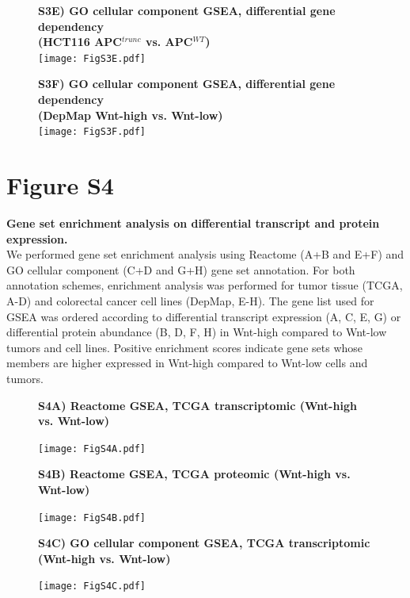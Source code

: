 \documentclass[11pt,a4paper,titlepage]{article}
\begin{document}
\begin{figure}[h!]
\textbf{S3E) GO cellular component GSEA, differential gene dependency\\(HCT116 APC$^{trunc}$ vs. APC$^{WT}$)}\\

\smallskip
\texttt{[image: FigS3E.pdf]} 
\end{figure}

\begin{figure}[h!]
\textbf{S3F) GO cellular component GSEA, differential gene dependency\\(DepMap Wnt-high vs. Wnt-low)}\\

\smallskip
\texttt{[image: FigS3F.pdf]} 
\end{figure}


\clearpage

\section*{Figure S4}



\textbf{Gene set enrichment analysis on differential transcript and protein expression.}\\
We performed gene set enrichment analysis using Reactome (A+B and E+F) and GO cellular component (C+D and G+H) gene set annotation. For both annotation schemes, enrichment analysis was performed for tumor tissue (TCGA, A-D) and colorectal cancer cell lines (DepMap, E-H). The gene list used for GSEA was ordered according to differential transcript expression (A, C, E, G) or differential protein abundance (B, D, F, H) in Wnt-high compared to Wnt-low tumors and cell lines. Positive enrichment scores indicate gene sets whose members are higher expressed in Wnt-high compared to Wnt-low cells and tumors.

\begin{figure}[h!]
\textbf{S4A) Reactome GSEA, TCGA transcriptomic (Wnt-high vs. Wnt-low)}

\smallskip
\texttt{[image: FigS4A.pdf]} 
\end{figure}

\begin{figure}[h!]
\textbf{S4B) Reactome GSEA, TCGA proteomic (Wnt-high vs. Wnt-low)}

\smallskip
\texttt{[image: FigS4B.pdf]} 
\end{figure}

\begin{figure}[h!]
\textbf{S4C) GO cellular component GSEA, TCGA transcriptomic (Wnt-high vs. Wnt-low)}

\smallskip
\texttt{[image: FigS4C.pdf]} 
\end{figure}
\end{document}
